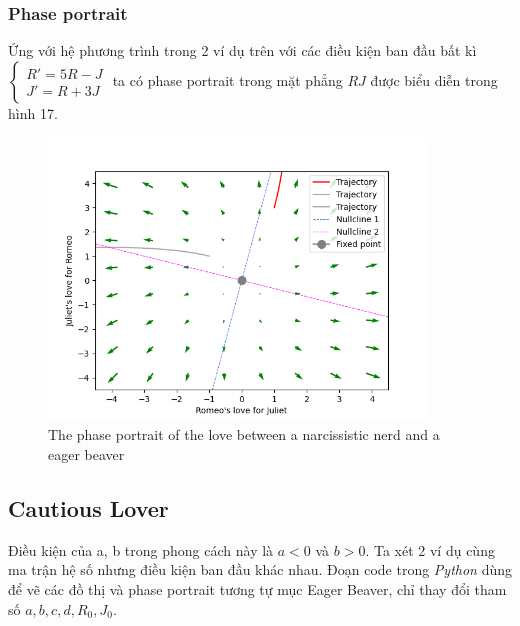 \subsubsection{Phase portrait}
Ứng với hệ phương trình trong 2 ví dụ trên với các điều kiện ban đầu bất kì
$\begin{cases}
        R'=5R-J\\
        J'=R+3J
\end{cases}$
ta có phase portrait trong mặt phẳng $RJ$ được biểu diễn trong hình 17.
\begin{figure}[h!]
    \begin{center}
    \includegraphics[width=10cm]{images/phase_portrait_narcissistic_nerd.png}
    \end{center}
    \caption{The phase portrait of the love between a narcissistic nerd and a eager beaver}
\end{figure}
\subsection{Cautious Lover}
Điều kiện của a, b trong phong cách này là $a < 0$ và $b > 0$. Ta xét 2 ví dụ cùng ma trận hệ số nhưng điều kiện ban đầu khác nhau. Đoạn code trong \textit{Python} dùng để vẽ các đồ thị và phase portrait tương tự mục Eager Beaver, chỉ thay đổi tham số $a, b, c, d, R_0, J_0$.

